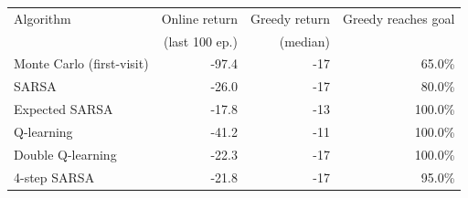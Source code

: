 \begin{tabular}{lrrr}
\toprule
Algorithm & Online return & Greedy return & Greedy reaches goal \\
 & (last 100 ep.) & (median) & \\
\midrule
Monte Carlo (first-visit) & -97.4 & -17 & 65.0\% \\
SARSA & -26.0 & -17 & 80.0\% \\
Expected SARSA & -17.8 & -13 & 100.0\% \\
Q-learning & -41.2 & -11 & 100.0\% \\
Double Q-learning & -22.3 & -17 & 100.0\% \\
4-step SARSA & -21.8 & -17 & 95.0\% \\
\bottomrule
\end{tabular}
